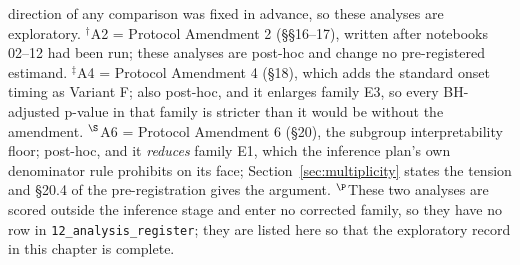 \begin{table}[H]
{    direction of any comparison was fixed in advance, so these analyses are
    exploratory. $^\dagger$A2 = Protocol Amendment 2 (\S\S16--17), written after
    notebooks 02--12 had been run; these analyses are post-hoc and change no
    pre-registered estimand. $^\ddagger$A4 = Protocol Amendment 4 (\S18), which
    adds the standard onset timing as Variant F; also post-hoc, and it enlarges
    family E3, so every BH-adjusted p-value in that family is stricter than it
    would be without the amendment. $^\S$A6 = Protocol Amendment 6 (\S20), the
    subgroup interpretability floor; post-hoc, and it \emph{reduces} family E1,
    which the inference plan's own denominator rule prohibits on its face;
    Section~\ref{sec:multiplicity} states the tension and \S20.4 of the
    pre-registration gives the argument. $^\P$These two analyses are scored
    outside the inference stage and enter no corrected family, so they have no
    row in \texttt{12\_analysis\_register}; they are listed here so that the
    exploratory record in this chapter is complete.}
    \label{tab:register}
\end{table}

